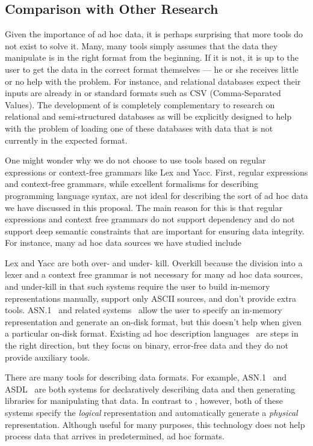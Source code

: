 \documentclass[11pt]{article}
\begin{document}
\subsection{Comparison with Other Research}
\label{ssec:related}

Given the importance of ad hoc data, it is perhaps surprising that
more tools do not exist to solve it.  Many, many tools simply assumes
that the data they manipulate is in the right format from the
beginning.  If it is not, it is up to the user to get the data in the
correct format themselves --- he or she receives little or no help
with the problem. For instance, \xml{} and relational databases expect
their inputs are already in \xml{} or standard formats such as CSV
(Comma-Separated Values).  The development of \datatype{} is
completely complementary to research on relational and semi-structured
databases as \datatype will be explicitly designed to help with the
problem of loading one of these databases with data that is not
currently in the expected format.

One might wonder why we do not choose to use tools based on
regular expressions or context-free grammars like Lex and Yacc.
First, regular expressions and context-free grammars, while excellent
formalisms for describing programming language syntax, are not ideal
for describing the sort of ad hoc data we have discussed in this proposal.
The main reason for this is that regular expressions and context free grammars
do not support dependency and do not support deep semantic constraints
that are important for ensuring data integrity.
For instance, many ad hoc data sources we have studied include
 
Lex and Yacc are
both over- and under- kill.  Overkill because the division into a
lexer and a context free grammar is not necessary for many ad hoc data
sources, and under-kill in that such systems require the user to build
in-memory representations manually, support only ASCII sources, and
don't provide extra tools.  ASN.1~\cite{asn} and related
systems~\cite{asdl} allow the user to specify an in-memory
representation and generate an on-disk format, but this doesn't help
when given a particular on-disk format.  Existing ad hoc description
languages~\cite{gpce02,sigcomm00,erlang} are steps in the right
direction, but they focus on binary, error-free data and they do not
provide auxiliary tools.


There are many tools for describing data formats. For example,
\textsc{ASN.1}~\cite{asn} and \textsc{ASDL}~\cite{asdl} are both
systems for declaratively describing data and then generating
libraries for manipulating that data.  In contrast to \pads{},
however, both of these systems specify the {\em logical\/} representation
and automatically generate a {\em physical\/} representation.
Although useful for many purposes, this technology does not help
process data that arrives in predetermined, ad hoc formats.
\end{document}
